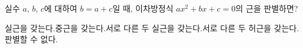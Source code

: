 실수 $a$, $b$, $c$에 대하여 $b=a+c$일 때, 이차방정식 $ax^2+bx+c=0$의 근을 판별하면?
\begin{choicesv}{실근을 갖는다.}{중근을 갖는다.}{서로 다른 두 실근을 갖는다.}{서로 다른 두 허근을 갖는다.}{판별할 수 없다.}\end{choicesv}
